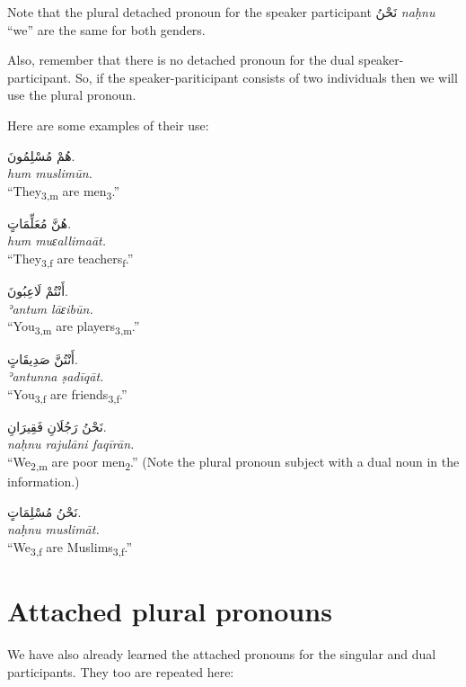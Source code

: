 \documentclass[
  10pt,
]{book}
\begin{document}
Note that the plural detached pronoun for the speaker participant
\foreignlanguage{arabic}{نَحْنُ} \emph{naḥnu} \enquote{we}
are the same for both genders.

Also, remember that there is no detached pronoun for the dual speaker-participant.
So, if the speaker-pariticipant consists of two individuals then we will use the plural pronoun.

Here are some examples of their use:

\foreignlanguage{arabic}{هُمْ مُسْلِمُونَ.}\\
\emph{hum muslimūn.}\\
\enquote{They\textsubscript{3,m} are men\textsubscript{3}.}

\foreignlanguage{arabic}{هُنَّ مُعَلِّمَاتٍ.}\\
\emph{hum muɛallimaāt.}\\
\enquote{They\textsubscript{3,f} are teachers\textsubscript{f}.}

\foreignlanguage{arabic}{أَنْتُمْ لَاعِبُونَ.}\\
\emph{ʾantum lāɛibūn.}\\
\enquote{You\textsubscript{3,m} are players\textsubscript{3,m}.}

\foreignlanguage{arabic}{أَنْتُنَّ صَدِيقَاتٍ.}\\
\emph{ʾantunna ṣadīqāt.}\\
\enquote{You\textsubscript{3,f} are friends\textsubscript{3,f}.}

\foreignlanguage{arabic}{نَحْنُ رَجُلَانِ فَقِيرَانِ.}\\
\emph{naḥnu rajulāni faqīrān.}\\
\enquote{We\textsubscript{2,m} are poor men\textsubscript{2}.} (Note the plural pronoun subject with a dual noun in the information.)

\foreignlanguage{arabic}{نَحْنُ مُسْلِمَاتٍ.}\\
\emph{naḥnu muslimāt.}\\
\enquote{We\textsubscript{3,f} are Muslims\textsubscript{3,f}.}

\section{Attached plural pronouns}\label{attached-plural-pronouns}

We have also already learned the attached pronouns for the singular and dual participants. They too are repeated here:
\end{document}
